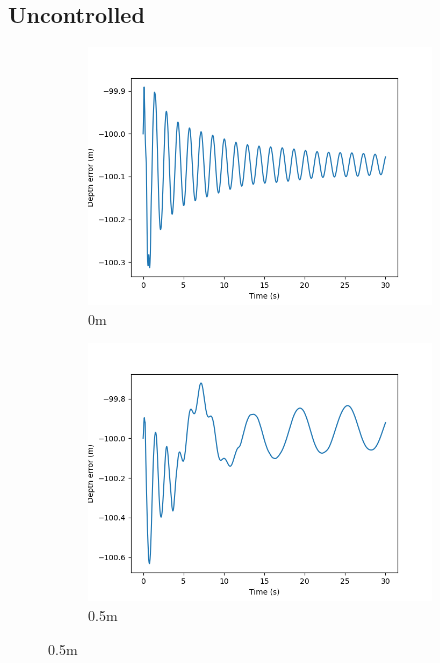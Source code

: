 \documentclass[class=article, crop=false]{standalone}
\begin{document}
\subsection{Uncontrolled}
\begin{figure}
    \centering
    \begin{subfigure}[b]{0.48\textwidth}
        \centering
        \includegraphics{scenario1/rov-0m/0.0m/rov_depth_error_uncontrolled}
        \caption{0m}
        \label{}
    \end{subfigure}
    \hfill
    \begin{subfigure}[b]{0.48\textwidth}
        \centering
        \includegraphics{scenario1/rov-0m/0.5m/rov_depth_error_uncontrolled}
        \caption{0.5m}

\end{subfigure}
\end{figure}
\end{document}
